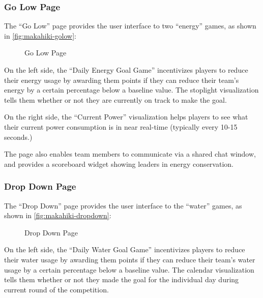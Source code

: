 \clearpage

\subsubsection{Go Low Page}

The ``Go Low'' page provides the user interface to two ``energy'' games, as shown in \autoref{fig:makahiki-golow}:

\begin{figure}[!ht]
\begin{center}
\end{center}
\caption{Go Low Page}
\label{fig:makahiki-golow}
\end{figure}

On the left side, the ``Daily Energy Goal Game'' incentivizes players to reduce their energy usage by awarding them points if they can reduce their team's energy by a certain percentage below a baseline value. The stoplight visualization tells them whether or not they are currently on track to make the goal.

On the right side, the ``Current Power'' visualization helps players to see what their current power consumption is in near real-time (typically every 10-15 seconds.)

The page also enables team members to communicate via a shared chat window, and provides a scoreboard widget showing leaders in energy conservation.

\clearpage

\subsubsection{Drop Down Page}

The ``Drop Down'' page provides the user interface to the ``water'' games, as shown in \autoref{fig:makahiki-dropdown}:

\begin{figure}[!ht]
\begin{center}
\end{center}
\caption{Drop Down Page}
\label{fig:makahiki-dropdown}
\end{figure}

On the left side, the ``Daily Water Goal Game'' incentivizes players to reduce their water usage by awarding them points if they can reduce their team's water usage by a certain percentage below a baseline value. The calendar visualization tells them whether or not they made the goal for the individual day during current round of the competition.

